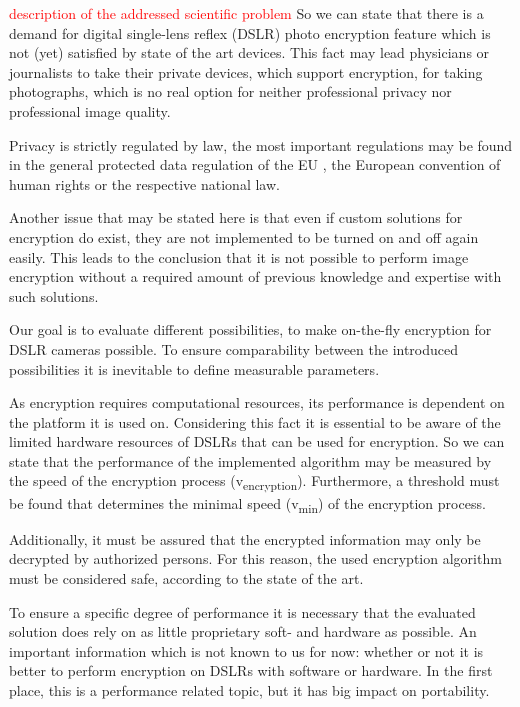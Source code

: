 \documentclass[12pt,a4paper,titlepage,oneside]{scrartcl}
\newcommand\todo[1]{\textcolor{red}{#1}}
\begin{document}
\todo{description of the addressed scientific problem}
So we can state that there is a demand for digital single-lens reflex (DSLR) photo encryption feature which is not (yet) satisfied by state of the art devices.
This fact may lead physicians or journalists to take their private devices, which support encryption, for taking photographs, which is no real option for neither professional privacy nor professional image quality.

Privacy is strictly regulated by law, the most important regulations may be found in the general protected data regulation of the EU \cite{EuropeanParliament2016}, the European convention of human rights \cite{EuropeanCourtofHumanRights2010} or the respective national law. \cite{EHG2015, DSG2000, ELGA2012}

Another issue that may  be stated here is that even if custom solutions for encryption do exist, they are not implemented to be turned on and off again easily.
This leads to the conclusion that it is not possible to perform image encryption without a required amount of previous knowledge and expertise with such solutions.

Our goal is to evaluate different possibilities, to make on-the-fly encryption for DSLR cameras possible.
To ensure comparability between the introduced possibilities it is inevitable to define measurable parameters.

As encryption requires computational resources, its performance is dependent on the platform it is used on.
Considering this fact it is essential to be aware of the limited hardware resources of DSLRs that can be used for encryption.
So we can state that the performance of the implemented algorithm may be measured by the speed of the encryption process (v\textsubscript{encryption}).
Furthermore, a threshold must be found that determines the minimal speed (v\textsubscript{min}) of the encryption process.

Additionally, it must be assured that the encrypted information may only be decrypted by authorized persons.
For this reason, the used encryption algorithm must be considered safe, according to the state of the art.

To ensure a specific degree of performance it is necessary that the evaluated solution does rely on as little proprietary soft- and hardware as possible.
An important information which is not known to us for now: whether or not it is better to perform encryption on DSLRs with software or hardware.
In the first place, this is a performance related topic, but it has big impact on portability.
\end{document}
